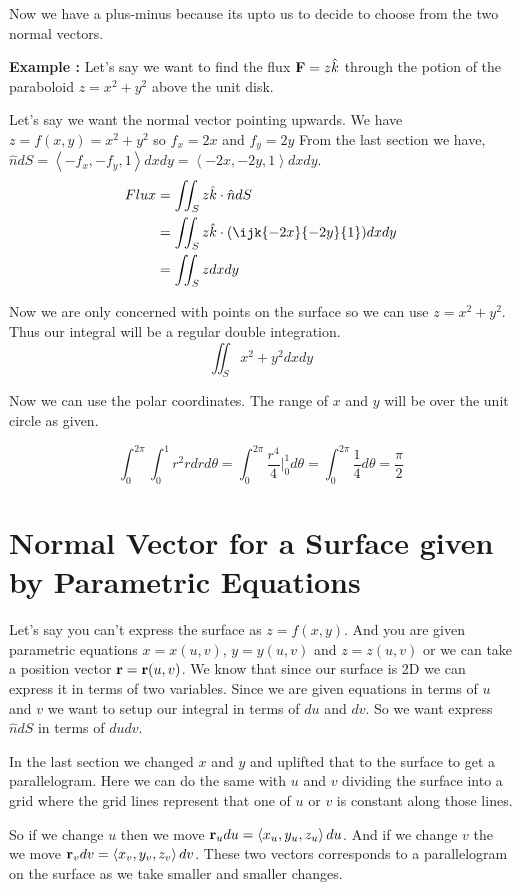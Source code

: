Now we have a plus-minus because its upto us to decide to choose from the two normal vectors.


{\bf Example : } Let's say we want to find the flux ${\bf F} = z \hat{k}$ 
through the potion of the paraboloid $z = x^2 + y^2$ above the unit disk.

Let's say we want the normal vector pointing upwards.
We have $z = f(x, y) = x^2 + y^2$ so $f_x = 2x$ and $f_y = 2y$
From the last section we have, $\hat{n}dS = \left< -f_x, -f_y, 1 \right> dx dy = \left< -2x, -2y, 1 \right> dx dy$.
\begin{align*}
Flux & = \iint_S z \hat{k} \cdot \hat{n} dS \\
    & = \iint_S z \hat{k} \cdot (\ijk{-2x}{-2y}{1}) dx dy \\
    & = \iint_S z dx dy
\end{align*}

Now we are only concerned with points on the surface so we can use $z = x^2 + y^2$.
Thus our integral will be a regular double integration.
$$ \iint_S x^2 + y^2 dx dy $$

Now we can use the polar coordinates. The range of $x$ and $y$ will be over the unit circle as given.

$$ \int_0^{2\pi} \int_0^1 r^2 r dr d\theta = \int_0^{2\pi} \frac{r^4}{4} \Big|_0^1 d\theta = \int_0^{2\pi} \frac{1}{4} d\theta = \frac{\pi}{2} $$

\section{Normal Vector for a Surface given by Parametric Equations}

Let's say you can't express the surface as $z = f(x, y)$.
And you are given parametric equations $x = x(u, v)$, $y = y(u, v)$ and $z = z(u, v)$ or we can take a position vector ${\bf r} = {\bf r}(u, v)$.
We know that since our surface is 2D we can express it in terms of two variables.
Since we are given equations in terms of $u$ and $v$ we want to setup our integral in terms of $du$ and $dv$.
So we want express $\hat{n}dS$ in terms of $du dv$. 

In the last section we changed $x$ and $y$ and uplifted that to the surface to get a parallelogram.
Here we can do the same with $u$ and $v$ dividing the surface into a grid where the grid lines represent that one of $u$ or $v$ is constant along those lines.

So if we change $u$ then we move ${\bf r}_u du = \left< x_u, y_u, z_u \right> du$.
And if we change $v$ the we move ${\bf r}_v dv = \left< x_v, y_v, z_v \right> dv$.
These two vectors corresponds to a parallelogram on the surface as we take smaller and smaller changes.


